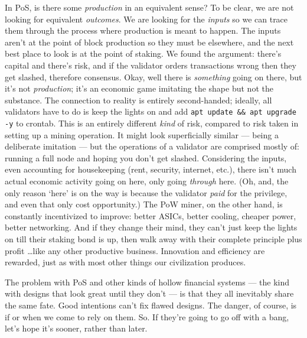 In PoS, is there some \emph{production} in an equivalent sense?
To be clear, we are not looking for equivalent \emph{outcomes}.
We are looking for the \emph{inputs} so we can trace them through the process where production is meant to happen.
The inputs aren't at the point of block production so they must be elsewhere, and the next best place to look is at the point of staking.
We found the argument: there's capital and there's risk, and if the validator orders transactions wrong then they get slashed, therefore consensus.
Okay, well there is \emph{something} going on there, but it's not \emph{production}; it's an economic game imitating the shape but not the substance.
The connection to reality is entirely second-handed; ideally, all validators have to do is keep the lights on and add \texttt{apt update \&\& apt upgrade -y} to crontab.
This is an entirely different \emph{kind} of risk, compared to risk taken in setting up a mining operation.
It might look superficially similar --- being a deliberate imitation --- but the operations of a validator are comprised mostly of: running a full node and hoping you don't get slashed.
Considering the inputs, even accounting for housekeeping (rent, security, internet, etc.), there isn't much actual economic activity going on here, only going \emph{through} here.
(Oh, and, the only reason `here' is on the way is because the validator \emph{paid} for the privilege, and even that only cost opportunity.)
The PoW miner, on the other hand, is constantly incentivized to improve: better ASICs, better cooling, cheaper power, better networking.
And if they change their mind, they can't just keep the lights on till their staking bond is up, then walk away with their complete principle plus profit \ldots like any other productive business.
Innovation and efficiency are rewarded, just as with most other things our civilization produces.

The problem with PoS and other kinds of hollow financial systems --- the kind with designs that look great until they don't --- is that they all inevitably share the same fate.
Good intentions can't fix flawed designs.
The danger, of course, is if or when we come to rely on them.
So.
If they're going to go off with a bang, let's hope it's sooner, rather than later.


